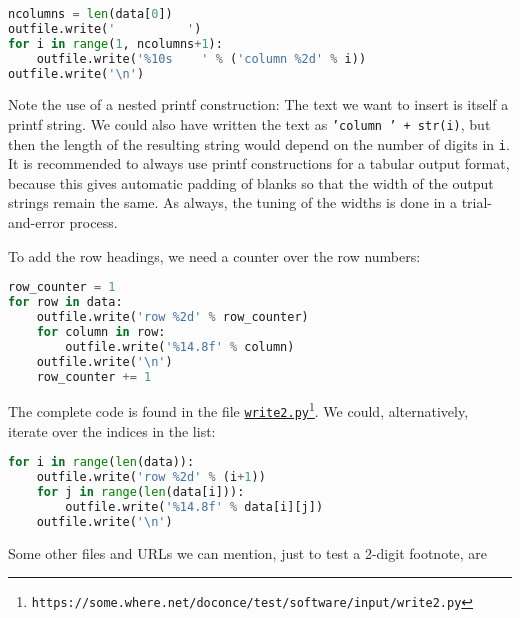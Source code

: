 \documentclass[graybox,sectrefs,envcountresetchap,open=right,final]{svmonodo}
\begin{document}
\begin{lstlisting}[language=Python,style=simple,xleftmargin=2mm]
ncolumns = len(data[0])
outfile.write('          ')
for i in range(1, ncolumns+1):
    outfile.write('%10s    ' % ('column %2d' % i))
outfile.write('\n')

\end{lstlisting}

Note the use of a nested printf construction: The text we want to
insert is itself a printf string. We could also have written the
text as \texttt{'column  ' + str(i)}, but then the length of the
resulting string would depend on the number of digits in \texttt{i}.
It is recommended to always use printf constructions for
a tabular output format, because this gives automatic padding of
blanks so that the width of the output strings remain the same.
As always, the tuning of the widths is done in a trial-and-error
process.

To add the row headings, we need a counter over the row numbers:









\begin{lstlisting}[language=Python,style=simple,xleftmargin=2mm]
row_counter = 1
for row in data:
    outfile.write('row %2d' % row_counter)
    for column in row:
        outfile.write('%14.8f' % column)
    outfile.write('\n')
    row_counter += 1

\end{lstlisting}

The complete code is found in the file \href{{https://some.where.net/doconce/test/software/input/write2.py}}{\nolinkurl{write2.py}\footnote{\texttt{https://some.where.net/doconce/test/software/input/write2.py}}}.
We could, alternatively, iterate over the indices in the list:







\begin{lstlisting}[language=Python,style=simple,xleftmargin=2mm]
for i in range(len(data)):
    outfile.write('row %2d' % (i+1))
    for j in range(len(data[i])):
        outfile.write('%14.8f' % data[i][j])
    outfile.write('\n')

\end{lstlisting}

Some other files and URLs we can mention, just to test a 2-digit footnote,
are
\end{document}
